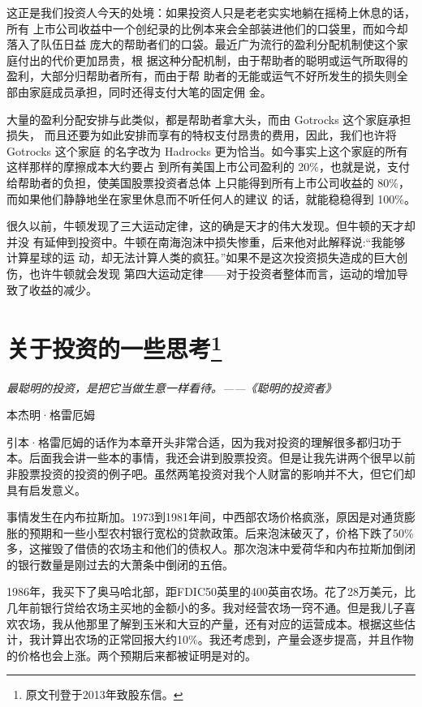 \documentclass[UTF8,a4paper,zihao=-4,fontset = windows]{ctexart} %
\begin{document}
这正是我们投资人今天的处境：如果投资人只是老老实实地躺在摇椅上休息的话，所有
上市公司收益中一个创纪录的比例本来会全部装进他们的口袋里，而如今却落入了队伍日益
庞大的帮助者们的口袋。最近广为流行的盈利分配机制使这个家庭付出的代价更加昂贵，根
据这种分配机制，由于帮助者的聪明或运气所取得的盈利，大部分归帮助者所有，而由于帮
助者的无能或运气不好所发生的损失则全部由家庭成员承担，同时还得支付大笔的固定佣
金。

大量的盈利分配安排与此类似，都是帮助者拿大头，而由 Gotrocks 这个家庭承担损失，
而且还要为如此安排而享有的特权支付昂贵的费用，因此，我们也许将 Gotrocks 这个家庭
的名字改为 Hadrocks 更为恰当。如今事实上这个家庭的所有这样那样的摩擦成本大约要占
到所有美国上市公司盈利的 20\%，也就是说，支付给帮助者的负担，使美国股票投资者总体
上只能得到所有上市公司收益的 80\%，而如果他们静静地坐在家里休息而不听任何人的建议
的话，就能稳稳得到 100\%。

很久以前，牛顿发现了三大运动定律，这的确是天才的伟大发现。但牛顿的天才却并没
有延伸到投资中。牛顿在南海泡沫中损失惨重，后来他对此解释说:“我能够计算星球的运
动，却无法计算人类的疯狂。”如果不是这次投资损失造成的巨大创伤，也许牛顿就会发现
第四大运动定律——对于投资者整体而言，运动的增加导致了收益的减少。

\section[关于投资的一些思考]{关于投资的一些思考\footnote{原文刊登于2013年致股东信。}}

\epigraph{\textit{最聪明的投资，是把它当做生意一样看待。——《聪明的投资者》}}{本杰明·格雷厄姆}

引本·格雷厄姆的话作为本章开头非常合适，因为我对投资的理解很多都归功于本。后面我会讲一些本的事情，我还会讲到股票投资。但是让我先讲两个很早以前非股票投资的投资的例子吧。虽然两笔投资对我个人财富的影响并不大，但它们却具有启发意义。

事情发生在内布拉斯加。1973到1981年间，中西部农场价格疯涨，原因是对通货膨胀的预期和一些小型农村银行宽松的贷款政策。后来泡沫破灭了，价格下跌了50\%多，这摧毁了借债的农场主和他们的债权人。那次泡沫中爱荷华和内布拉斯加倒闭的银行数量是刚过去的大萧条中倒闭的五倍。

1986年，我买下了奥马哈北部，距FDIC50英里的400英亩农场。花了28万美元，比几年前银行贷给农场主买地的金额小的多。我对经营农场一窍不通。但是我儿子喜欢农场，我从他那里了解到玉米和大豆的产量，还有对应的运营成本。根据这些估计，我计算出农场的正常回报大约10\%。我还考虑到，产量会逐步提高，并且作物的价格也会上涨。两个预期后来都被证明是对的。
\end{document}
